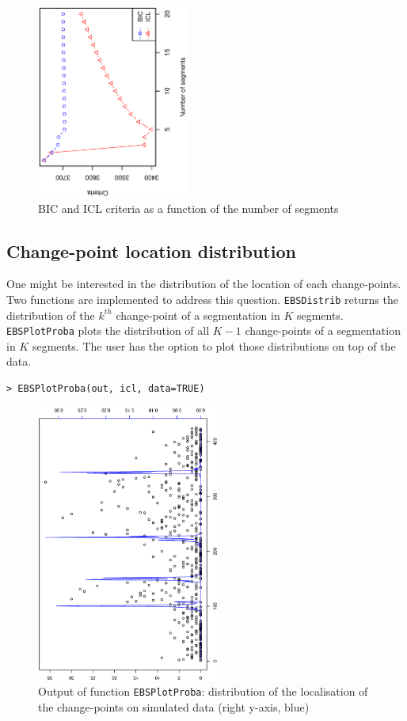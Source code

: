\documentclass{bioinfo}
\begin{document}
\begin{methods}
\begin{verbatim}
\end{verbatim}


\begin{figure}[!h]%
\centerline{\includegraphics[width=5cm,angle=270]{icl-bic.ps}}
\caption{BIC and ICL criteria as a function of the number of segments} \label{fig:01}
\end{figure}






\subsection{Change-point location distribution}

One might be interested in the
distribution of the location of each change-points. Two functions are
implemented to address this question. \texttt{EBSDistrib} returns the
distribution of the $k^{th}$ change-point of a segmentation in $K$
segments. \texttt{EBSPlotProba} plots the distribution of all
$K\!-\!1$ change-points of a segmentation in $K$ segments. The user
has the option to plot those distributions on top of the data.
\begin{verbatim}
> EBSPlotProba(out, icl, data=TRUE)
\end{verbatim}

\begin{figure}[!h]%
\centerline{\includegraphics[width=6cm,angle=270]{my-segmentation.ps}}
\caption{Output of function \texttt{EBSPlotProba}: distribution of the localisation of the change-points on simulated data (right y-axis, blue)}\label{fig:02}
\end{figure}





\end{methods}
\end{document}
